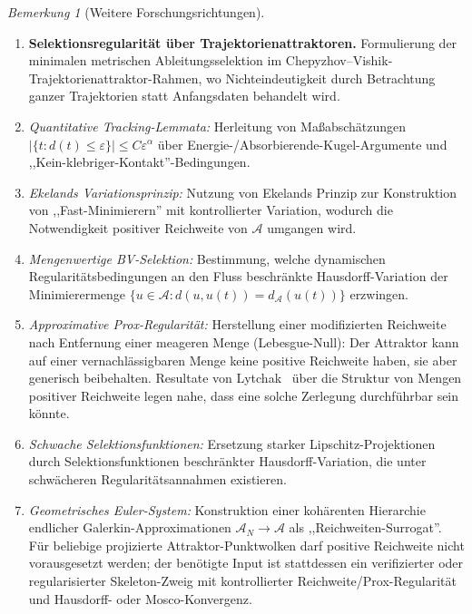 \documentclass[12pt,a4paper]{article}
\theoremstyle{definition}
\theoremstyle{plain}
\theoremstyle{remark}
\newtheorem{remark}[definition]{Bemerkung}
\begin{document}
\begin{remark}[Weitere Forschungsrichtungen]
\label{rem:further-ns-logdist}
\begin{enumerate}
\item \textbf{Selektionsregularität über Trajektorienattraktoren.}\; Formulierung der minimalen metrischen Ableitungsselektion im Chepyzhov--Vishik-Trajektorienattraktor-Rahmen, wo Nichteindeutigkeit durch Betrachtung ganzer Trajektorien statt Anfangsdaten behandelt wird.
\item \emph{Quantitative Tracking-Lemmata:} Herleitung von Maßabschätzungen $|\{t : d(t) \leq \varepsilon\}| \leq C \varepsilon^\alpha$ über Energie-/Absorbierende-Kugel-Argumente und ,,Kein-klebriger-Kontakt''-Bedingungen.
\item \emph{Ekelands Variationsprinzip:} Nutzung von Ekelands Prinzip zur Konstruktion von ,,Fast-Minimierern'' mit kontrollierter Variation, wodurch die Notwendigkeit positiver Reichweite von $\mathcal{A}$ umgangen wird.
\item \emph{Mengenwertige BV-Selektion:} Bestimmung, welche dynamischen Regularitätsbedingungen an den Fluss beschränkte Hausdorff-Variation der Minimierermenge $\{u \in \mathcal{A} : d(u, u(t)) = d_{\mathcal{A}}(u(t))\}$ erzwingen.
\item \emph{Approximative Prox-Regularität:} Herstellung einer modifizierten Reichweite nach Entfernung einer meageren Menge (Lebesgue-Null): Der Attraktor kann auf einer vernachlässigbaren Menge keine positive Reichweite haben, sie aber generisch beibehalten. Resultate von Lytchak~\cite{Lytchak2024} über die Struktur von Mengen positiver Reichweite legen nahe, dass eine solche Zerlegung durchführbar sein könnte.
\item \emph{Schwache Selektionsfunktionen:} Ersetzung starker Lipschitz-Projektionen durch Selektionsfunktionen beschränkter Hausdorff-Variation, die unter schwächeren Regularitätsannahmen existieren.
\item \emph{Geometrisches Euler-System:} Konstruktion einer kohärenten Hierarchie endlicher Galerkin-Approximationen $\mathcal{A}_N \to \mathcal{A}$ als ,,Reichweiten-Surrogat''. Für beliebige projizierte Attraktor-Punktwolken darf positive Reichweite nicht vorausgesetzt werden; der benötigte Input ist stattdessen ein verifizierter oder regularisierter Skeleton-Zweig mit kontrollierter Reichweite/Prox-Regularität und Hausdorff- oder Mosco-Konvergenz.
\end{enumerate}
\end{remark}
\end{document}
